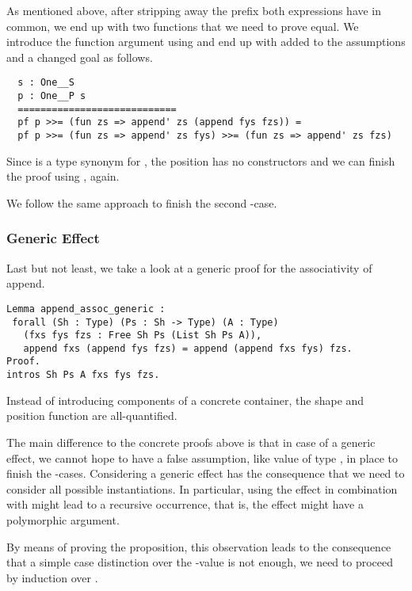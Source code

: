 As mentioned above, after stripping away the prefix both expressions have in common, we end up with two functions that we need to prove equal.
We introduce the function argument  using  and end up with  added to the assumptions and a changed goal as follows.

\begin{verbatim}
  s : One__S
  p : One__P s
  ============================
  pf p >>= (fun zs => append' zs (append fys fzs)) =
  pf p >>= (fun zs => append' zs fys) >>= (fun zs => append' zs fzs)
\end{verbatim}

Since  is a type synonym for , the position  has no constructors and we can finish the proof using , again.

We follow the same approach to finish the second -case.

\subsubsection{Generic Effect}
Last but not least, we take a look at a generic proof for the associativity of append.

\begin{verbatim}
Lemma append_assoc_generic :
 forall (Sh : Type) (Ps : Sh -> Type) (A : Type)
   (fxs fys fzs : Free Sh Ps (List Sh Ps A)),
   append fxs (append fys fzs) = append (append fxs fys) fzs.
Proof.
intros Sh Ps A fxs fys fzs.
\end{verbatim}

Instead of introducing components of a concrete container, the shape  and position function  are all-quantified.

The main difference to the concrete proofs above is that in case of a generic effect, we cannot hope to have a false assumption, like  value of type , in place to finish the -cases.
Considering a generic effect has the consequence that we need to consider all possible instantiations.
In particular, using the effect in combination with  might lead to a recursive occurrence, that is, the effect might have a polymorphic argument.

By means of proving the proposition, this observation leads to the consequence that a simple case distinction over the -value  is not enough, we need to proceed by induction over .

